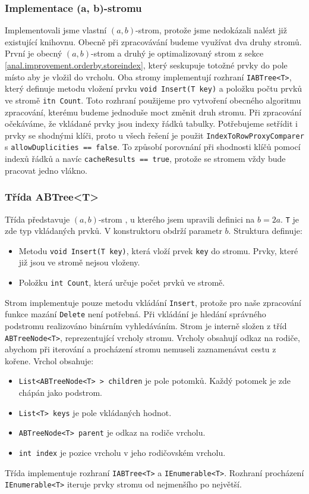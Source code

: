 \subsubsection{Implementace (a, b)-stromu}

Implementovali jsme vlastní $(a, b)$-strom, protože jsme nedokázali nalézt již existující knihovnu.
Obecně při zpracovávání budeme využívat dva druhy stromů.
První je obecný $(a, b)$-strom a druhý je optimalizovaný strom z sekce \ref{anal.improvement.orderby.storeindex}, který seskupuje totožné prvky do pole místo aby je vložil do vrcholu.
Oba stromy implementují rozhraní \texttt{IABTree<T>}, který definuje metodu vložení prvku \texttt{void Insert(T key)} a položku počtu prvků ve stromě \texttt{itn Count}.
Toto rozhraní použijeme pro vytvoření obecného algoritmu zpracování, kterému budeme jednoduše moct změnit druh stromu.
Při zpracování očekáváme, že vkládané prvky jsou indexy řádků tabulky.
Potřebujeme setřídit i prvky se shodnými klíči, proto u všech řešení je použit \texttt{IndexToRowProxyComparer} s \texttt{allowDuplicities == false}.
To způsobí porovnání při shodnosti klíčů pomocí indexů řádků a navíc \texttt{cacheResults == true}, protože se stromem vždy bude pracovat jedno vlákno.

\subsubsection{Třída ABTree<T>}

Třída představuje $(a, b)$-strom \citep[str. 190]{labyrint}, u kterého jsem upravili definici na $b=2a$.
\texttt{T} je zde typ vkládaných prvků.
V konstruktoru obdrží parametr $b$.
Struktura definuje:
\begin{itemize}
\item Metodu \texttt{void Insert(T key)}, která vloží prvek \texttt{key} do stromu.
Prvky, které již jsou ve stromě nejsou vloženy.
\item Položku \texttt{int Count}, která určuje počet prvků ve stromě.
\end{itemize}
Strom implementuje pouze metodu vkládání \texttt{Insert}, protože pro naše zpracování funkce mazání \texttt{Delete} není potřebná.
Při vkládání je hledání správného podstromu realizováno binárním vyhledáváním.
Strom je interně složen z tříd \texttt{ABTreeNode<T>}, reprezentující vrcholy stromu.
Vrcholy obsahují odkaz na rodiče, abychom při iterování a procházení stromu nemuseli zaznamenávat cestu z kořene.
Vrchol obsahuje:
\begin{itemize}
\item \texttt{List<ABTreeNode<T> > children} je pole potomků. Každý potomek je zde chápán jako podstrom.
\item \texttt{List<T> keys} je pole vkládaných hodnot.
\item \texttt{ABTreeNode<T> parent} je odkaz na rodiče vrcholu.
\item \texttt{int index} je pozice vrcholu v jeho rodičovském vrcholu.
\end{itemize}
Třída implementuje rozhraní \texttt{IABTree<T>} a \texttt{IEnumerable<T>}.
Rozhraní procházení \texttt{IEnumerable<T>} iteruje prvky stromu od nejmenšího po největší.

